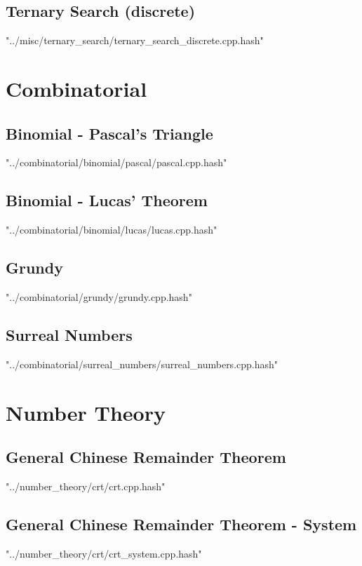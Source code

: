\documentclass [a4paper,5pt,oneside, landscape]{article}
\begin{document}
\begin{multicols}{3}
\subsection{ Ternary Search (discrete)}
 {"../misc/ternary_search/ternary_search_discrete.cpp.hash"}



\section{Combinatorial}
\subsection{ Binomial - Pascal's Triangle}
 {"../combinatorial/binomial/pascal/pascal.cpp.hash"}


\subsection{ Binomial - Lucas' Theorem}
 {"../combinatorial/binomial/lucas/lucas.cpp.hash"}


\subsection{ Grundy}
 {"../combinatorial/grundy/grundy.cpp.hash"}


\subsection{ Surreal Numbers}
 {"../combinatorial/surreal_numbers/surreal_numbers.cpp.hash"}



\section{Number Theory}
\subsection{ General Chinese Remainder Theorem}
 {"../number_theory/crt/crt.cpp.hash"}


\subsection{ General Chinese Remainder Theorem - System}
 {"../number_theory/crt/crt_system.cpp.hash"}



\end{multicols}
\end{document}
